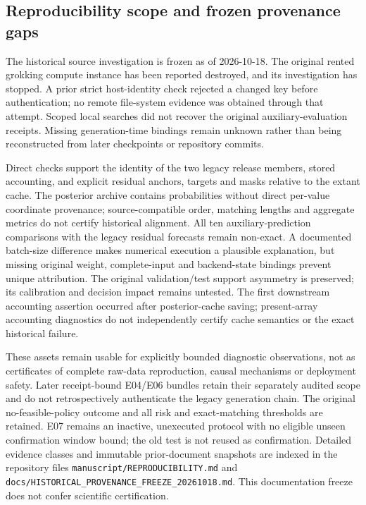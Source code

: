 \documentclass[
  journal]{IEEEtran}
\begin{document}
\subsection*{Reproducibility scope and frozen provenance
gaps}\label{reproducibility-scope-and-frozen-provenance-gaps}

The historical source investigation is frozen as of 2026-10-18. The
original rented grokking compute instance has been reported destroyed,
and its investigation has stopped. A prior strict host-identity check
rejected a changed key before authentication; no remote file-system
evidence was obtained through that attempt. Scoped local searches did
not recover the original auxiliary-evaluation receipts. Missing
generation-time bindings remain unknown rather than being reconstructed
from later checkpoints or repository commits.

Direct checks support the identity of the two legacy release members,
stored accounting, and explicit residual anchors, targets and masks
relative to the extant cache. The posterior archive contains
probabilities without direct per-value coordinate provenance;
source-compatible order, matching lengths and aggregate metrics do not
certify historical alignment. All ten auxiliary-prediction comparisons
with the legacy residual forecasts remain non-exact. A documented
batch-size difference makes numerical execution a plausible explanation,
but missing original weight, complete-input and backend-state bindings
prevent unique attribution. The original validation/test support
asymmetry is preserved; its calibration and decision impact remains
untested. The first downstream accounting assertion occurred after
posterior-cache saving; present-array accounting diagnostics do not
independently certify cache semantics or the exact historical failure.

These assets remain usable for explicitly bounded diagnostic
observations, not as certificates of complete raw-data reproduction,
causal mechanisms or deployment safety. Later receipt-bound E04/E06
bundles retain their separately audited scope and do not retrospectively
authenticate the legacy generation chain. The original
no-feasible-policy outcome and all risk and exact-matching thresholds
are retained. E07 remains an inactive, unexecuted protocol with no
eligible unseen confirmation window bound; the old test is not reused as
confirmation. Detailed evidence classes and immutable prior-document
snapshots are indexed in the repository files
\texttt{manuscript/REPRODUCIBILITY.md} and
\texttt{docs/HISTORICAL\_PROVENANCE\_FREEZE\_20261018.md}. This
documentation freeze does not confer scientific certification.
\end{document}
